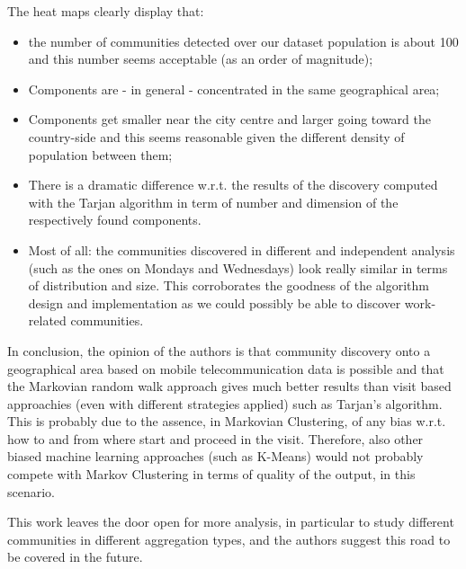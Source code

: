 \documentclass[12pt,a4paper]{article}
\begin{document}
The heat maps clearly display that:
\begin{itemize}
\item the number of communities detected over our dataset population is about
100 and this number seems acceptable (as an order of magnitude);
\item Components are - in general - concentrated in the same geographical area;
\item Components get smaller near the city centre and larger going toward the
country-side and this seems reasonable given the different density of population
between them;
\item There is a dramatic difference w.r.t. the results of the discovery
computed with the Tarjan algorithm in term of number and dimension of the
respectively found components.
\item Most of all: the communities discovered in different and independent
analysis (such as the ones on Mondays and Wednesdays) look really similar
in terms of distribution and size. This corroborates the goodness of the
algorithm design and implementation as we could possibly be able to
discover work-related communities.
\end{itemize}

In conclusion, the opinion of the authors is that community discovery
onto a geographical area based on mobile telecommunication data
is possible and that the Markovian random walk approach gives much better
results than visit based approachies (even with different strategies applied)
such as Tarjan's algorithm. This is probably due to the assence,
in Markovian Clustering, of any bias w.r.t. how to and from where start
and proceed in the visit. Therefore, also other biased machine learning
approaches (such as K-Means) would not probably compete with Markov
Clustering in terms of quality of the output, in this scenario.

This work leaves the door open for more analysis, in particular to study
different communities in different aggregation types, and the authors
suggest this road to be covered in the future.
\end{document}
